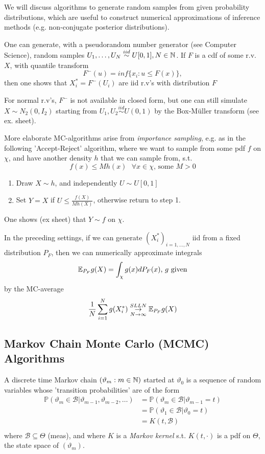 \documentclass[a4paper]{article}
\begin{document}
We will discuss algorithms to generate random samples from given probability distributions, which are useful to construct numerical approximations of inference methods (e.g. non-conjugate posterior distributions).

One can generate, with a pseudorandom number generator (see Computer Science), random samples $U_1, \ldots, U_N \stackrel{iid}{\sim} U[0,1], N \in \mathbb{N}$. If $F$ is a cdf of some r.v. $X$, with quantile transform 
\[
	F^{-}(u) = inf \{x_i : u \le F(x)\} 
,\]
then one shows that $X_i^{\ast} = F^{-} (U_i)$ are iid r.v's with distribution $F$

For normal r.v's, $F^{-}$ is not available in closed form, but one can still simulate $X \sim N_2 (0, I_2)$ starting from $U_1, U_2 \stackrel{iid}{\sim} U(0,1)$ by the Box-M{\"u}ller transform (see ex. sheet).

More elaborate MC-algorithms arise from \textit{importance sampling}, e.g. as in the following 'Accept-Reject' algorithm, where we want to sample from some pdf $f$ on $\chi$, and have another density $h$ that we can sample from, s.t. 
\[
	f(x) \le Mh(x) \text{  } \forall x \in \chi \text{, some } M>0
\] 

\begin{enumerate}
	\item Draw $X \sim h$, and independently $U \sim U[0,1]$
	\item Set $Y=X$ if $U \le \frac{f(X)}{M h(X)}$, otherwise return to step 1.
\end{enumerate}

One shows (ex sheet) that $Y \sim f$ on $\chi$.

In the preceding settings, if we can generate $\left(X_i^{\ast}\right)_{i = 1,\ldots,N}$ iid from a fixed distribution $P_F$, then we can numerically approximate integrals 
\[
	\mathbb{E}_{P_F} g(X) = \int_{\chi} g(x) dP_F(x) \text{, $g$ given}
\] 
by the MC-average
\[
	\frac{1}{N} \sum_{i=1}^{N} g(X_i^{\ast}) \underset{N\to \infty}{\overset{SLLN}{\to }} \mathbb{E}_{P_F} g(X)
\] 

\subsection{Markov Chain Monte Carlo (MCMC) Algorithms}

A discrete time Markov chain $(\vartheta_m : m\in \mathbb{N})$ started at $\vartheta_0$ is a sequence of random variables whose 'transition probabilities' are of the form
\begin{align*}
\mathbb{P}\left( \vartheta_m \in \mathcal{B} | \vartheta_{m-1}, \vartheta_{m-2}, \ldots \right) &= \mathbb{P}\left( \vartheta_m \in \mathcal{B} | \vartheta_{m-1} = t \right) \\
&= \mathbb{P}\left( \vartheta_1 \in \mathcal{B} | \vartheta_0 = t \right) \\
&= K(t,\mathcal{B}) \\
\end{align*}
where $\mathcal{B} \subseteq \Theta$ (meas), and where $K$ is a \textit{Markov kernel} s.t. $K(t, \cdot )$ is a pdf on $\Theta$, the state space of $(\vartheta_m)$.
\end{document}
